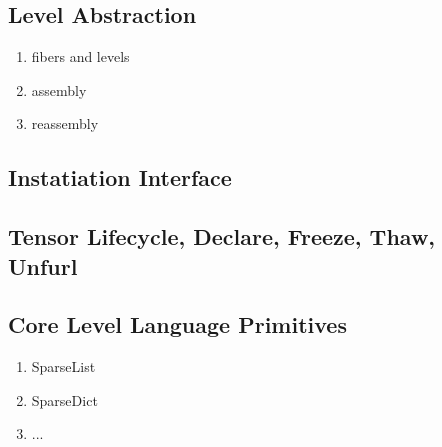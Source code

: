 \subsection{Level Abstraction}
    
\begin{enumerate}
\item fibers and levels
\item assembly
\item reassembly
\end{enumerate}

\subsection{Instatiation Interface}

\subsection{Tensor Lifecycle, Declare, Freeze, Thaw, Unfurl}


\subsection{Core Level Language Primitives}
\begin{enumerate}
\item SparseList
\item SparseDict
\item ...
\end{enumerate}


